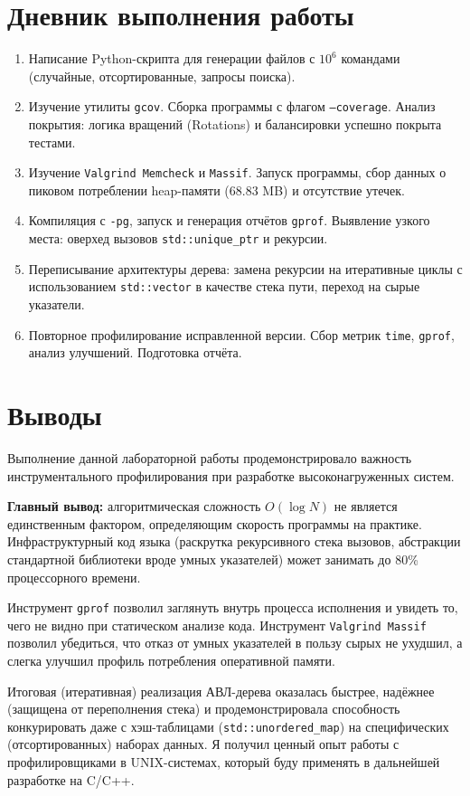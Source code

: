 \section{Дневник выполнения работы}
\begin{enumerate}
    \item Написание Python-скрипта для генерации файлов с $10^6$ командами (случайные, отсортированные, запросы поиска).
    \item Изучение утилиты \texttt{gcov}. Сборка программы с флагом \texttt{--coverage}. Анализ покрытия: логика вращений (Rotations) и балансировки успешно покрыта тестами.
    \item Изучение \texttt{Valgrind Memcheck} и \texttt{Massif}. Запуск программы, сбор данных о пиковом потреблении heap-памяти (68.83 MB) и отсутствие утечек.
    \item Компиляция с \texttt{-pg}, запуск и генерация отчётов \texttt{gprof}. Выявление узкого места: оверхед вызовов \texttt{std::unique\_ptr} и рекурсии.
    \item Переписывание архитектуры дерева: замена рекурсии на итеративные циклы с использованием \texttt{std::vector} в качестве стека пути, переход на сырые указатели.
    \item Повторное профилирование исправленной версии. Сбор метрик \texttt{time}, \texttt{gprof}, анализ улучшений. Подготовка отчёта.
\end{enumerate}

\section{Выводы}

Выполнение данной лабораторной работы продемонстрировало важность инструментального профилирования при разработке высоконагруженных систем. 

\textbf{Главный вывод:} алгоритмическая сложность $O(\log N)$ не является единственным фактором, определяющим скорость программы на практике. Инфраструктурный код языка (раскрутка рекурсивного стека вызовов, абстракции стандартной библиотеки вроде умных указателей) может занимать до 80\% процессорного времени.

Инструмент \texttt{gprof} позволил заглянуть внутрь процесса исполнения и увидеть то, чего не видно при статическом анализе кода. Инструмент \texttt{Valgrind Massif} позволил убедиться, что отказ от умных указателей в пользу сырых не ухудшил, а слегка улучшил профиль потребления оперативной памяти.

Итоговая (итеративная) реализация АВЛ-дерева оказалась быстрее, надёжнее (защищена от переполнения стека) и продемонстрировала способность конкурировать даже с хэш-таблицами (\texttt{std::unordered\_map}) на специфических (отсортированных) наборах данных. Я получил ценный опыт работы с профилировщиками в UNIX-системах, который буду применять в дальнейшей разработке на C/C++.
\pagebreak